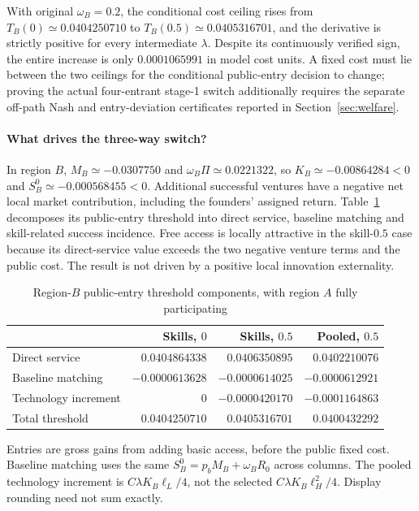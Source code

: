 With original $\omega_B=0.2$, the conditional cost ceiling rises from $T_B(0)\simeq0.0404250710$ to $T_B(0.5)\simeq0.0405316701$, and the derivative is strictly positive for every intermediate $\lambda$. Despite its continuously verified sign, the entire increase is only $0.0001065991$ in model cost units. A fixed cost must lie between the two ceilings for the conditional public-entry decision to change; proving the actual four-entrant stage-1 switch additionally requires the separate off-path Nash and entry-deviation certificates reported in Section~\ref{sec:welfare}.


\paragraph{What drives the three-way switch?}

In region $B$, $M_B\simeq-0.0307750$ and $\omega_B\Pi\simeq0.0221322$, so $K_B\simeq-0.00864284<0$ and $S_B^0\simeq-0.000568455<0$.
Additional successful ventures have a negative net local market contribution, including the founders' assigned return.
Table~\ref{tab:diagnostic} decomposes its public-entry threshold into direct service, baseline matching and skill-related success incidence.
Free access is locally attractive in the skill-$0.5$ case because its direct-service value exceeds the two negative venture terms and the public cost.
The result is not driven by a positive local innovation externality.

\begin{table}[htbp]\centering\small
\caption{Region-$B$ public-entry threshold components, with region $A$ fully participating}\label{tab:diagnostic}
\begin{tabular}{@{}lrrr@{}}\toprule
 & Skills, $0$ & Skills, $0.5$ & Pooled, $0.5$\\\midrule
Direct service & $0.0404864338$ & $0.0406350895$ & $0.0402210076$\\
Baseline matching & $-0.0000613628$ & $-0.0000614025$ & $-0.0000612921$\\
Technology increment & $0$ & $-0.0000420170$ & $-0.0001164863$\\\midrule
Total threshold & $0.0404250710$ & $0.0405316701$ & $0.0400432292$\\\bottomrule
\end{tabular}
\par\smallskip\footnotesize Entries are gross gains from adding basic access, before the public fixed cost. Baseline matching uses the same $S_B^0=p_bM_B+\omega_BR_0$ across columns. The pooled technology increment is $C\lambda K_B\ell_L/4$, not the selected $C\lambda K_B\ell_H^2/4$. Display rounding need not sum exactly.
\end{table}

